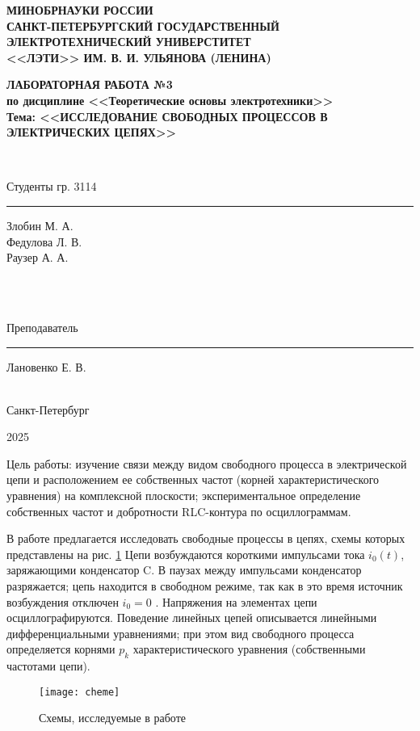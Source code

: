 \documentclass[a4paper,14pt ]{article} %
\begin{document}
 
\begin{titlepage}
    \begin{center}
        {\bf  МИНОБРНАУКИ РОССИИ\\
        САНКТ-ПЕТЕРБУРГСКИЙ ГОСУДАРСТВЕННЫЙ\\
        ЭЛЕКТРОТЕХНИЧЕСКИЙ УНИВЕРСТИТЕТ\\
        <<ЛЭТИ>> ИМ. В. И. УЛЬЯНОВА (ЛЕНИНА)\\
    
        }
    \end{center}
    \vfill
        {
        \begin{center}
            \bfseries
            ЛАБОРАТОРНАЯ РАБОТА №3\\
            по дисциплине <<Теоретические основы электротехники>>\\
            Тема: <<ИССЛЕДОВАНИЕ СВОБОДНЫХ ПРОЦЕССОВ
            В ЭЛЕКТРИЧЕСКИХ ЦЕПЯХ>>\\
        \end{center}
        }
        \
    \vfill
        {\noindent\parbox{4cm}{Студенты гр. 3114}  \hfill \parbox{3cm}{\rule{3cm}{0.15mm}} \hfill \parbox{4cm}{\raggedleft Злобин М. А.\\ Федулова Л. В. \\ Раузер А. А.}} \\\\
        \parbox{4cm}{Преподаватель} \hfill \parbox{3cm}{\rule{3cm}{0.15mm}} \hfill \parbox{4cm}{\raggedleft Лановенко Е. В.} \\ 
        \center Санкт-Петербург
        
        2025
\end{titlepage}
Цель работы: изучение связи между видом свободного процесса
в электрической цепи и расположением ее собственных частот 
(корней характеристического уравнения) на комплексной плоскости; 
экспериментальное определение собственных частот и добротности RLC-контура 
по осциллограммам. 


В работе предлагается исследовать свободные процессы в цепях, схемы
которых представлены на рис. \ref{fig:1} Цепи возбуждаются короткими импульсами тока
$i_0(t)$, заряжающими конденсатор C. В паузах между импульсами
конденсатор разряжается; цепь находится в свободном режиме, так как в это
время источник возбуждения отключен
$i_0 = 0$
. Напряжения на элементах
цепи осциллографируются.
Поведение линейных цепей описывается линейными дифференциальными уравнениями;
 при этом вид свободного процесса определяется корнями $p_k$
характеристического уравнения (собственными частотами цепи).
\begin{figure}[H]
    \centering
    \texttt{[image: cheme]}
    \caption{Схемы, исследуемые в работе}
    \label{fig:1}
\end{figure}
\end{document}
